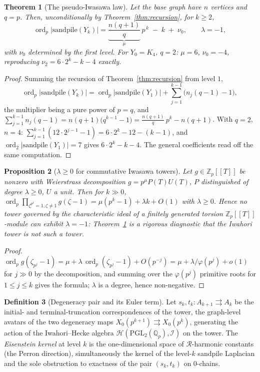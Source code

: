 \documentclass[11pt]{amsart}
\numberwithin{equation}{section}
\newtheorem{theorem}{Theorem}[section]
\newtheorem{proposition}[theorem]{Proposition}
\theoremstyle{definition}
\newtheorem{definition}[theorem]{Definition}
\theoremstyle{remark}
\newcommand{\Z}{\mathbb{Z}}
\newcommand{\Q}{\mathbb{Q}}
\newcommand{\cH}{\mathcal{H}}
\newcommand{\cI}{\mathcal{I}}
\newcommand{\cR}{\mathcal{R}}
\newcommand{\PGL}{\mathrm{PGL}}
\newcommand{\ord}{\operatorname{ord}}
\begin{document}
\begin{theorem}[The pseudo-Iwasawa law]\label{thm:pseudo}
Let the base graph have $n$ vertices and $q=p$. Then, unconditionally by
Theorem~\ref{thm:recursion},
for $k\ge2$,
\[
\ord_p\bigl|\mathrm{sandpile}(Y_k)\bigr|
=\underbrace{\frac{n(q+1)}{q}}_{\mu}\,p^{\,k}\;-\;k\;+\;\nu_0,
\qquad
\lambda=-1,
\]
with $\nu_0$ determined by the first level. For $Y_0=K_4$, $q=2$:
$\mu=6$, $\nu_0=-4$, reproducing $\nu_2=6\cdot2^k-k-4$ exactly.
\end{theorem}

\begin{proof}
Summing the recursion of Theorem~\ref{thm:recursion} from level $1$,
\[
\ord_p|\mathrm{sandpile}(Y_k)|
=\ord_p|\mathrm{sandpile}(Y_1)|+\sum_{j=1}^{k-1}\bigl(n_j(q-1)-1\bigr),
\]
the multiplier being a pure power of $p=q$, and
$\sum_{j=1}^{k-1}n_j(q-1)=n(q+1)\bigl(q^{k-1}-1\bigr)=\tfrac{n(q+1)}q\,p^{k}-n(q+1)$.
With $q=2$, $n=4$: $\sum_{j=1}^{k-1}(12\cdot2^{j-1}-1)=6\cdot2^{k}-12-(k-1)$, and
$\ord_2|\mathrm{sandpile}(Y_1)|=7$ gives $6\cdot2^k-k-4$. The general coefficients
read off the same computation.
\end{proof}

\begin{proposition}[$\lambda\ge0$ for commutative Iwasawa towers]\label{prop:lampos}
Let $g\in\Z_p[[T]]$ be nonzero with Weierstrass decomposition
$g=p^{\mu}P(T)U(T)$, $P$ distinguished of degree $\lambda\ge0$, $U$ a unit. Then for
$k\gg0$,
$\ord_p\prod_{\zeta^{p^k}=1,\zeta\neq1}g(\zeta-1)=\mu(p^k-1)+\lambda k+O(1)$
with $\lambda\ge0$. Hence no tower governed by the characteristic ideal of a finitely
generated torsion $\Z_p[[T]]$-module can exhibit $\lambda=-1$: Theorem~\ref{thm:pseudo}
is a rigorous diagnostic that the Iwahori tower is not such a tower.
\end{proposition}

\begin{proof}
$\ord_p g(\zeta_{p^j}-1)=\mu+\lambda\,\ord_p(\zeta_{p^j}-1)+O(p^{-j})
=\mu+\lambda/\varphi(p^j)+o(1)$ for $j\gg0$ by the decomposition, and summing over the
$\varphi(p^j)$ primitive roots for $1\le j\le k$ gives the formula; $\lambda$ is a
degree, hence non-negative.
\end{proof}

\begin{definition}[Degeneracy pair and its Euler term]\label{def:degeneracy}
Let $s_k,t_k\colon A_{k+1}\rightrightarrows A_k$ be the initial- and
terminal-truncation correspondences of the tower, the graph-level avatars of the two
degeneracy maps $X_0(p^{k+1})\rightrightarrows X_0(p^k)$, generating the action of the
Iwahori--Hecke algebra $\cH(\PGL_2(\Q_p),\cI)$ on the tower. The \emph{Eisenstein
kernel} at level $k$ is the one-dimensional space of $\cR$-harmonic constants (the
Perron direction), simultaneously the kernel of the level-$k$ sandpile Laplacian and
the sole obstruction to exactness of the pair $(s_k,t_k)$ on $0$-chains.
\end{definition}
\end{document}
